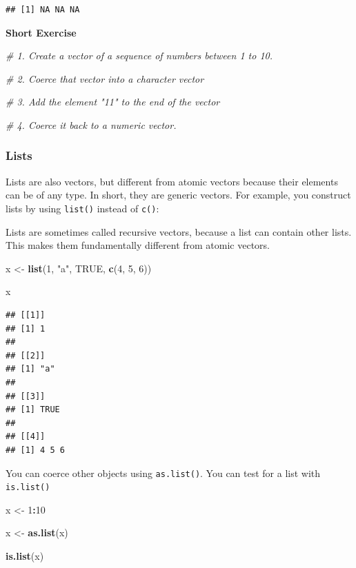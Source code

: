 \documentclass[
]{book}
\newenvironment{Shaded}{\begin{snugshade}}{\end{snugshade}}
\newcommand{\CommentTok}[1]{\textcolor[rgb]{0.56,0.35,0.01}{\textit{#1}}}
\newcommand{\ConstantTok}[1]{\textcolor[rgb]{0.56,0.35,0.01}{#1}}
\newcommand{\DecValTok}[1]{\textcolor[rgb]{0.00,0.00,0.81}{#1}}
\newcommand{\FunctionTok}[1]{\textcolor[rgb]{0.13,0.29,0.53}{\textbf{#1}}}
\newcommand{\NormalTok}[1]{#1}
\newcommand{\OtherTok}[1]{\textcolor[rgb]{0.56,0.35,0.01}{#1}}
\newcommand{\SpecialCharTok}[1]{\textcolor[rgb]{0.81,0.36,0.00}{\textbf{#1}}}
\newcommand{\StringTok}[1]{\textcolor[rgb]{0.31,0.60,0.02}{#1}}
\begin{document}
\begin{verbatim}
## [1] NA NA NA
\end{verbatim}

\textbf{Short Exercise}

\begin{Shaded}
\begin{Highlighting}[]
\CommentTok{\# 1. Create a vector of a sequence of numbers between 1 to 10.}

\CommentTok{\# 2. Coerce that vector into a character vector}

\CommentTok{\# 3. Add the element "11" to the end of the vector}

\CommentTok{\# 4. Coerce it back to a numeric vector.}
\end{Highlighting}
\end{Shaded}

\subsubsection{Lists}\label{lists}

Lists are also vectors, but different from atomic vectors because their elements can be of any type. In short, they are generic vectors. For example, you construct lists by using \texttt{list()} instead of \texttt{c()}:

Lists are sometimes called recursive vectors, because a list can contain other lists. This makes them fundamentally different from atomic vectors.

\begin{Shaded}
\begin{Highlighting}[]
\NormalTok{x }\OtherTok{\textless{}{-}} \FunctionTok{list}\NormalTok{(}\DecValTok{1}\NormalTok{, }\StringTok{"a"}\NormalTok{, }\ConstantTok{TRUE}\NormalTok{, }\FunctionTok{c}\NormalTok{(}\DecValTok{4}\NormalTok{, }\DecValTok{5}\NormalTok{, }\DecValTok{6}\NormalTok{))}

\NormalTok{x}
\end{Highlighting}
\end{Shaded}

\begin{verbatim}
## [[1]]
## [1] 1
## 
## [[2]]
## [1] "a"
## 
## [[3]]
## [1] TRUE
## 
## [[4]]
## [1] 4 5 6
\end{verbatim}

You can coerce other objects using \texttt{as.list()}. You can test for a list with \texttt{is.list()}

\begin{Shaded}
\begin{Highlighting}[]
\NormalTok{x }\OtherTok{\textless{}{-}} \DecValTok{1}\SpecialCharTok{:}\DecValTok{10}

\NormalTok{x }\OtherTok{\textless{}{-}} \FunctionTok{as.list}\NormalTok{(x)}

\FunctionTok{is.list}\NormalTok{(x)}
\end{Highlighting}
\end{Shaded}
\end{document}

